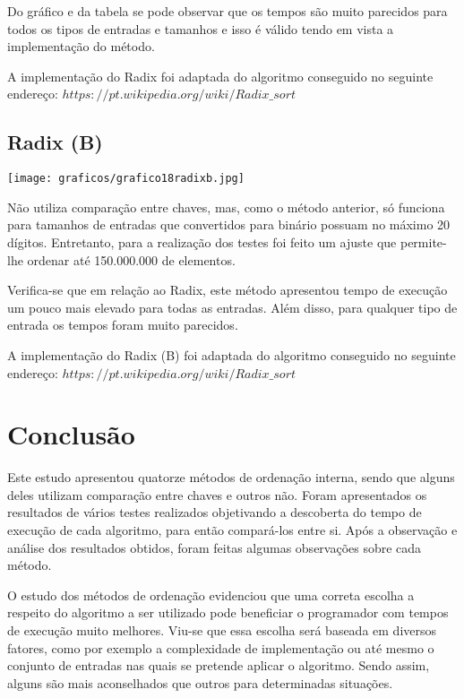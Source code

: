 \documentclass[12pt,a4paper]{article}
\begin{document}
Do gráfico e da tabela se pode observar que os tempos são muito parecidos para todos os tipos de entradas e tamanhos e isso é válido tendo em vista a implementação do método.

A implementação do Radix foi adaptada do algoritmo conseguido no seguinte endereço: $https://pt.wikipedia.org/wiki/Radix\_sort$








\subsection{Radix (B)}
\begin{center}
\texttt{[image: graficos/grafico18radixb.jpg]}
\end{center}

Não utiliza comparação entre chaves, mas, como o método anterior, só funciona para tamanhos de entradas que convertidos para binário possuam no máximo 20 dígitos. Entretanto, para a realização dos testes foi feito um ajuste que permite-lhe ordenar até 150.000.000 de elementos.

Verifica-se que em relação ao Radix, este método apresentou tempo de execução um pouco mais elevado para todas as entradas. Além disso, para qualquer tipo de entrada os tempos foram muito parecidos.

A implementação do Radix (B) foi adaptada do algoritmo conseguido no seguinte endereço: $https://pt.wikipedia.org/wiki/Radix\_sort$







\section{Conclusão}

Este estudo apresentou quatorze métodos de ordenação interna, sendo que alguns deles utilizam comparação entre chaves e outros não. Foram apresentados os resultados de vários testes realizados objetivando a descoberta do tempo de execução de cada algoritmo, para então compará-los entre si. Após a observação e análise dos resultados obtidos, foram feitas algumas observações sobre cada método.

O estudo dos métodos de ordenação evidenciou que uma correta escolha a respeito do algoritmo a ser utilizado pode beneficiar o programador com tempos de execução muito melhores. Viu-se que essa escolha será baseada em diversos fatores, como por exemplo a complexidade de implementação ou até mesmo o conjunto de entradas nas quais se pretende aplicar o algoritmo. Sendo assim, alguns são mais aconselhados que outros para determinadas situações.
\end{document}
